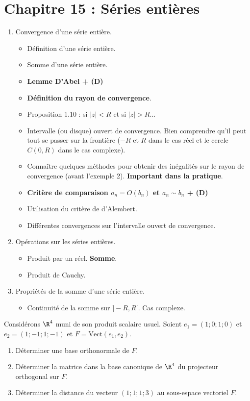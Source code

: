 \documentclass[twoside,a4paper,french,10pt]{VcCours}
\begin{document}
\section*{Chapitre 15 : Séries entières}
\begin{enumerate}
\item Convergence d'une série entière.
\begin{itemize}
\item Définition d'une série entière.
\item Somme d'une série entière.
\item \textbf{Lemme D'Abel + (D)}
\item \textbf{Définition du rayon de convergence}.
\item Proposition 1.10 : si $\vert z \vert < R$ et si $\vert z \vert >R$...
\item Intervalle (ou disque) ouvert de convergence. Bien comprendre qu'il peut tout se passer sur la frontière ($-R$ et $R$ dans le cas réel et le cercle $C(0,R)$ dans le cas complexe).
\item Connaître quelques méthodes pour obtenir des inégalités sur le rayon de convergence (avant l'exemple 2). \textbf{Important dans la pratique}.
\item \textbf{Critère de comparaison $a_n = O(b_n)$ et $a_n \sim b_n$ + (D)}
\item Utilisation du critère de d'Alembert.
\item Différentes convergences sur l'intervalle ouvert de convergence.
\end{itemize}
\item Opérations sur les séries entières.
\begin{itemize}
\item Produit par un réel. \textbf{Somme}. 
\item Produit de Cauchy.
\end{itemize}
\item Propriétés de la somme d'une série entière.
\begin{itemize}
\item Continuité de la somme sur $]-R,R[$. Cas complexe.
\end{itemize}
\end{enumerate}

\begin{Exercice}{} Considérons $\R^4$ muni de son produit scalaire usuel. Soient $e_1=(1;0;1;0)$ et $e_2=(1;-1;1;-1)$ et $F=\textrm{Vect}(e_1,e_2)$.
  \begin{enumerate}
      \item  Déterminer une base orthonormale de $F.$
      \item  Déterminer la matrice dans la base canonique de $\R^4$ du projecteur orthogonal
  sur $F.$
      \item  Déterminer la distance du vecteur $(1;1;1;3)$ au sous-espace vectoriel  $F$.
  \end{enumerate}
  \end{Exercice}
\end{document}

